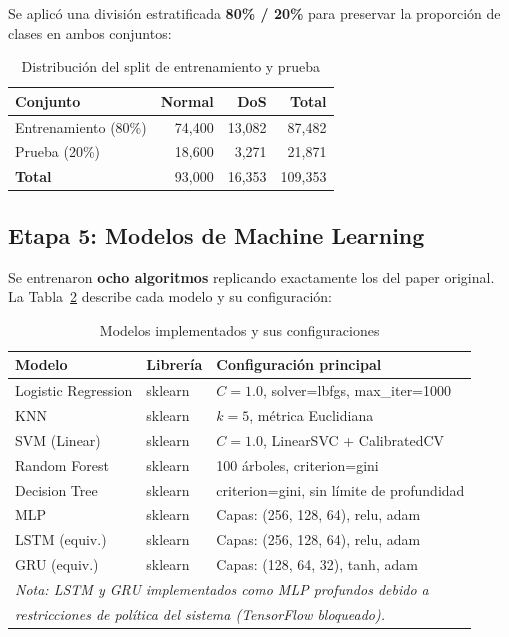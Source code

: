 \documentclass[12pt,a4paper]{article}
\begin{document}
Se aplicó una división estratificada \textbf{80\% / 20\%} para preservar la proporción de
clases en ambos conjuntos:

\begin{table}[H]
\centering
\caption{Distribución del split de entrenamiento y prueba}
\label{tab:split}
\begin{tabular}{lrrr}
\toprule
\textbf{Conjunto} & \textbf{Normal} & \textbf{DoS} & \textbf{Total} \\
\midrule
Entrenamiento (80\%) & 74{,}400 & 13{,}082 & 87{,}482 \\
Prueba        (20\%) & 18{,}600 &  3{,}271 & 21{,}871 \\
\midrule
\textbf{Total}       & 93{,}000 & 16{,}353 & 109{,}353 \\
\bottomrule
\end{tabular}
\end{table}

\subsection{Etapa 5: Modelos de Machine Learning}

Se entrenaron \textbf{ocho algoritmos} replicando exactamente los del paper original.
La Tabla~\ref{tab:modelos} describe cada modelo y su configuración:

\begin{table}[H]
\centering
\caption{Modelos implementados y sus configuraciones}
\label{tab:modelos}
\begin{tabular}{llp{6cm}}
\toprule
\textbf{Modelo} & \textbf{Librería} & \textbf{Configuración principal} \\
\midrule
Logistic Regression & sklearn & $C=1.0$, solver=lbfgs, max\_iter=1000 \\
KNN                 & sklearn & $k=5$, métrica Euclidiana \\
SVM (Linear)        & sklearn & $C=1.0$, LinearSVC + CalibratedCV \\
Random Forest       & sklearn & 100 árboles, criterion=gini \\
Decision Tree       & sklearn & criterion=gini, sin límite de profundidad \\
MLP                 & sklearn & Capas: (256, 128, 64), relu, adam \\
LSTM (equiv.)       & sklearn & Capas: (256, 128, 64), relu, adam \\
GRU (equiv.)        & sklearn & Capas: (128, 64, 32), tanh, adam \\
\bottomrule
\multicolumn{3}{l}{\small \textit{Nota: LSTM y GRU implementados como MLP profundos debido a}}\\
\multicolumn{3}{l}{\small \textit{restricciones de política del sistema (TensorFlow bloqueado).}}
\end{tabular}
\end{table}
\end{document}
